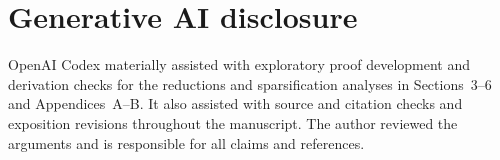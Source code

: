 \documentclass[11pt,letterpaper]{article}
\begin{document}
\clearpage
\setcounter{tocdepth}{2}
\begingroup
\small
\makeatletter
\renewcommand*\l@section[2]{%
  \ifnum \c@tocdepth >\z@
    \addpenalty\@secpenalty
    \addvspace{.4em \@plus\p@}%
    \setlength\@tempdima{1.5em}%
    \begingroup
      \parindent \z@ \rightskip \@pnumwidth
      \parfillskip -\@pnumwidth
      \leavevmode \bfseries
      \advance\leftskip\@tempdima
      \hskip -\leftskip
      #1\nobreak\hfil
      \nobreak\hb@xt@\@pnumwidth{\hss #2\kern-\p@\kern\p@}\par
    \endgroup
  \fi}
\tableofcontents
\makeatother
\endgroup
\clearpage














\clearpage
\appendix



\section*{Generative AI disclosure}
OpenAI Codex materially assisted with exploratory proof development and
derivation checks for the reductions and sparsification analyses in
Sections~3--6 and Appendices~A--B. It also assisted with source and
citation checks and exposition revisions throughout the manuscript. The
author reviewed the arguments and is responsible for all claims and
references.


\begingroup
\small
{}
{}

\endgroup
\end{document}
